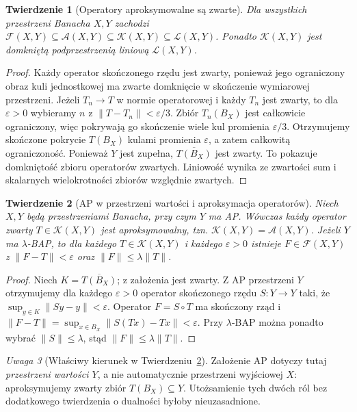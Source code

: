 \documentclass[11pt,a4paper]{article}
\numberwithin{equation}{section}
\theoremstyle{plain}
\newtheorem{twierdzenie}{Twierdzenie}[section]
\theoremstyle{definition}
\theoremstyle{remark}
\newtheorem{uwaga}[twierdzenie]{Uwaga}
\begin{document}
\begin{twierdzenie}[Operatory aproksymowalne są zwarte]
\label{thm:approximable-compact28}
Dla wszystkich przestrzeni Banacha $X,Y$ zachodzi
$\mathcal F(X,Y)\subseteq\mathcal A(X,Y)\subseteq
\mathcal K(X,Y)\subseteq\mathcal L(X,Y)$.
Ponadto $\mathcal K(X,Y)$ jest domkniętą podprzestrzenią
liniową $\mathcal L(X,Y)$.
\end{twierdzenie}
\begin{proof}
Każdy operator skończonego rzędu jest zwarty, ponieważ
jego ograniczony obraz kuli jednostkowej ma zwarte
domknięcie w skończenie wymiarowej przestrzeni.
Jeżeli $T_n\to T$ w normie operatorowej i każdy $T_n$
jest zwarty, to dla $\varepsilon>0$ wybieramy $n$ z
$\|T-T_n\|<\varepsilon/3$. Zbiór $T_n(B_X)$ jest
całkowicie ograniczony, więc pokrywają go skończenie
wiele kul promienia $\varepsilon/3$.
Otrzymujemy skończone pokrycie $T(B_X)$ kulami
promienia $\varepsilon$, a zatem całkowitą ograniczoność.
Ponieważ $Y$ jest zupełna, $\overline{T(B_X)}$ jest zwarty.
To pokazuje domkniętość zbioru operatorów zwartych.
Liniowość wynika ze zwartości sum i skalarnych
wielokrotności zbiorów względnie zwartych.
\end{proof}

\begin{twierdzenie}[AP w przestrzeni wartości i aproksymacja operatorów]
\label{thm:ap-compact-operators28}
Niech $X,Y$ będą przestrzeniami Banacha, przy czym
$Y$ ma AP. Wówczas każdy operator zwarty
$T\in\mathcal K(X,Y)$ jest aproksymowalny, tzn.
$\mathcal K(X,Y)=\mathcal A(X,Y)$.
Jeżeli $Y$ ma $\lambda$-BAP, to dla każdego
$T\in\mathcal K(X,Y)$ i każdego $\varepsilon>0$
istnieje $F\in\mathcal F(X,Y)$ z
$\|F-T\|<\varepsilon$ oraz $\|F\|\le\lambda\|T\|$.
\end{twierdzenie}
\begin{proof}
Niech $K=\overline{T(B_X)}$; z założenia jest zwarty.
Z AP przestrzeni $Y$ otrzymujemy dla każdego
$\varepsilon>0$ operator skończonego rzędu
$S:Y\to Y$ taki, że
$\sup_{y\in K}\|Sy-y\|<\varepsilon$.
Operator $F=S\circ T$ ma skończony rząd i
$\|F-T\|=\sup_{x\in B_X}\|S(Tx)-Tx\|<\varepsilon$.
Przy $\lambda$-BAP można ponadto wybrać $\|S\|\le\lambda$,
stąd $\|F\|\le\lambda\|T\|$.
\end{proof}

\begin{uwaga}[Właściwy kierunek w Twierdzeniu~\ref{thm:ap-compact-operators28}]
\label{rem:range-not-domain28}
Założenie AP dotyczy tutaj \emph{przestrzeni wartości $Y$},
a nie automatycznie przestrzeni wyjściowej $X$:
aproksymujemy zwarty zbiór $T(B_X)\subseteq Y$.
Utożsamienie tych dwóch ról bez dodatkowego twierdzenia
o dualności byłoby nieuzasadnione.
\end{uwaga}
\end{document}
